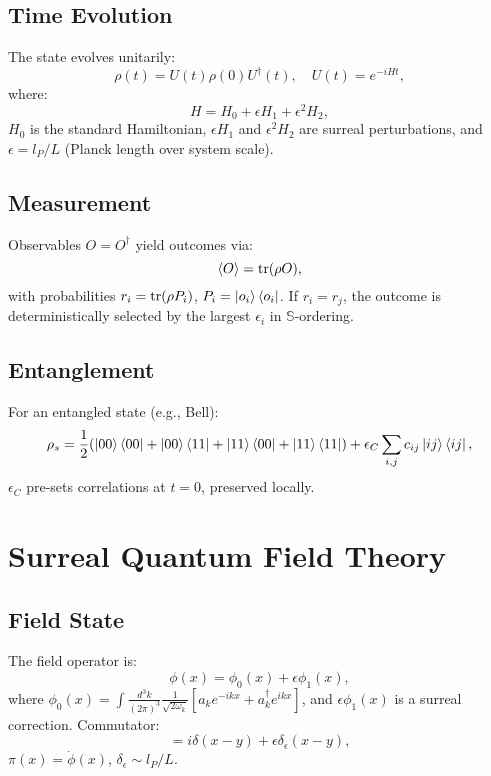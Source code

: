 \documentclass{article}
\begin{document}
\subsection{Time Evolution}
The state evolves unitarily:
\begin{equation}
\rho(t) = U(t) \rho(0) U^\dagger(t), \quad U(t) = e^{-i H t},
\end{equation}
where:
\begin{equation}
H = H_0 + \epsilon H_1 + \epsilon^2 H_2,
\end{equation}
\(H_0\) is the standard Hamiltonian, \(\epsilon H_1\) and \(\epsilon^2 H_2\) are surreal perturbations, and \(\epsilon = l_P / L\) (Planck length over system scale).

\subsection{Measurement}
Observables \(O = O^\dagger\) yield outcomes via:
\begin{equation}
\ev{O} = \tr(\rho O),
\end{equation}
with probabilities \(r_i = \tr(\rho P_i)\), \(P_i = \ket{o_i}\bra{o_i}\). If \(r_i = r_j\), the outcome is deterministically selected by the largest \(\epsilon_i\) in \(\mathbb{S}\)-ordering.

\subsection{Entanglement}
For an entangled state (e.g., Bell):
\begin{equation}
\rho_s = \frac{1}{2} (\ket{00}\bra{00} + \ket{00}\bra{11} + \ket{11}\bra{00} + \ket{11}\bra{11}) + \epsilon_C \sum_{i,j} c_{ij} \ket{ij}\bra{ij},
\end{equation}
\(\epsilon_C\) pre-sets correlations at \(t=0\), preserved locally.

\section{Surreal Quantum Field Theory}
\subsection{Field State}
The field operator is:
\begin{equation}
\phi(x) = \phi_0(x) + \epsilon \phi_1(x),
\end{equation}
where \(\phi_0(x) = \int \frac{d^3k}{(2\pi)^3} \frac{1}{\sqrt{2\omega_k}} [a_k e^{-ikx} + a_k^\dagger e^{ikx}]\), and \(\epsilon \phi_1(x)\) is a surreal correction. Commutator:
\begin{equation}
[\phi(x), \pi(y)] = i \delta(x-y) + \epsilon \delta_\epsilon(x-y),
\end{equation}
\(\pi(x) = \dot{\phi}(x)\), \(\delta_\epsilon \sim l_P / L\).
\end{document}
